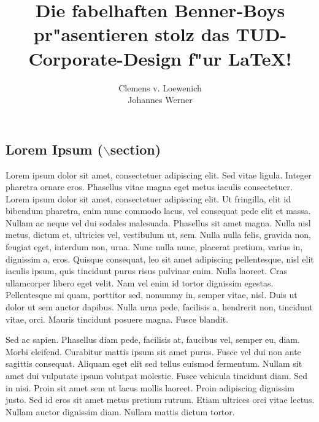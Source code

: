 \documentclass[c0paper, colorbacktitle, accentcolor=tud9c]{tudposter}
\title{Die fabelhaften Benner-Boys pr"asentieren
  stolz das TUD-Corporate-Design f"ur {\LaTeX}!}
\subtitle{Clemens v. Loewenich\\Johannes Werner}
\begin{document}
 \maketitle\vfill
 \begin{multicols}{3}
   \section*{Lorem Ipsum ($\backslash$section)}

    Lorem ipsum dolor sit amet, consectetuer adipiscing elit. Sed vitae ligula. Integer pharetra ornare eros. Phasellus vitae magna eget metus iaculis consectetuer. Lorem ipsum dolor sit amet, consectetuer adipiscing elit. Ut fringilla, elit id bibendum pharetra, enim nunc commodo lacus, vel consequat pede elit et massa. Nullam ac neque vel dui sodales malesuada. Phasellus sit amet magna. Nulla nisl metus, dictum et, ultricies vel, vestibulum ut, sem. Nulla nulla felis, gravida non, feugiat eget, interdum non, urna. Nunc nulla nunc, placerat pretium, varius in, dignissim a, eros. Quisque consequat, leo sit amet adipiscing pellentesque, nisl elit iaculis ipsum, quis tincidunt purus risus pulvinar enim. Nulla laoreet. Cras ullamcorper libero eget velit. Nam vel enim id tortor dignissim egestas. Pellentesque mi quam, porttitor sed, nonummy in, semper vitae, nisl. Duis ut dolor ut sem auctor dapibus. Nulla urna pede, facilisis a, hendrerit non, tincidunt vitae, orci. Mauris tincidunt posuere magna. Fusce blandit.

    Sed ac sapien. Phasellus diam pede, facilisis at, faucibus vel, semper eu, diam. Morbi eleifend. Curabitur mattis ipsum sit amet purus. Fusce vel dui non ante sagittis consequat. Aliquam eget elit sed tellus euismod fermentum. Nullam sit amet dui vulputate ipsum volutpat molestie. Fusce vehicula tincidunt diam. Sed in nisi. Proin sit amet sem ut lacus mollis laoreet. Proin adipiscing dignissim justo. Sed id eros sit amet metus pretium rutrum. Etiam ultrices orci vitae lectus. Nullam auctor dignissim diam. Nullam mattis dictum tortor.


\end{multicols}
\end{document}
